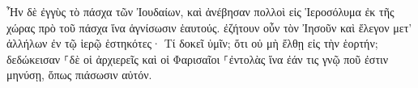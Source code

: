 \documentclass{openreader}
\begin{document}
Ἦν δὲ ἐγγὺς τὸ πάσχα τῶν Ἰουδαίων, καὶ ἀνέβησαν πολλοὶ εἰς Ἱεροσόλυμα ἐκ τῆς χώρας πρὸ τοῦ πάσχα ἵνα ἁγνίσωσιν ἑαυτούς. 
ἐζήτουν οὖν τὸν Ἰησοῦν καὶ ἔλεγον μετ’ ἀλλήλων ἐν τῷ ἱερῷ ἑστηκότες· Τί δοκεῖ ὑμῖν; ὅτι οὐ μὴ ἔλθῃ εἰς τὴν ἑορτήν; 
δεδώκεισαν ⸀δὲ οἱ ἀρχιερεῖς καὶ οἱ Φαρισαῖοι ⸀ἐντολὰς ἵνα ἐάν τις γνῷ ποῦ ἐστιν μηνύσῃ, ὅπως πιάσωσιν αὐτόν. 
\end{document}
